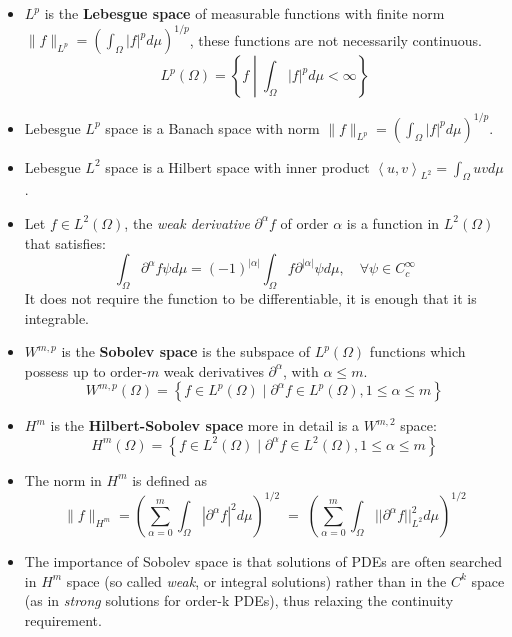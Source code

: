 \documentclass{digitaldynamics}
\begin{document}
\begin{itemize}
\begin{itemize}
		\item $L^p$ is the \textbf{Lebesgue space} of measurable functions with finite norm $\| f \|_{L^p}=\left( \int_\Omega |f|^p d\mu \right)^{1/p}$, these functions are not necessarily continuous.
		\[
		L^p(\Omega) = \left\{ f \; \left| \; \int_\Omega |f|^p d\mu < \infty \right. \right\}
		\]
		
		\item Lebesgue $L^p$ space is a Banach space with norm 
		$\| f \|_{L^p}=\left( \int_\Omega |f|^p d\mu \right)^{1/p}$.
		
		\item Lebesgue $L^2$ space is a Hilbert space with inner product 
		$\left\langle u , v \right\rangle_{L^2} = \int_\Omega u v d\mu$.
		
		\item Let $f \in L^2(\Omega)$, the \textit{weak derivative} $\partial^\alpha f$ of order $\alpha$ is a function in $L^2(\Omega)$ that satisfies:
		\[
		\int_\Omega \partial^\alpha f \psi d\mu =  (-1)^{|\alpha|} \int_\Omega f \partial^{|\alpha|} \psi d\mu, \quad \forall \psi 
		\in C^{\infty}_c
		\]
		It does not require the function to be differentiable, it is enough that it is integrable.
		
		\item  $W^{m,p}$ is the \textbf{Sobolev space} is the subspace of $L^p(\Omega)$ functions which possess up to order-$m$ weak derivatives $\partial^\alpha$, with $\alpha \leq m$.
		\[
		W^{m,p}(\Omega) = \left\{ f \in L^p(\Omega) \; | \; \partial^\alpha f \in L^p(\Omega), 1\leq  \alpha \leq m \right\}
		\]
		
		\item  $H^m$ is the \textbf{Hilbert-Sobolev space} more in detail is a $W^{m,2}$ space:
		\[
		H^m(\Omega) = \left\{ f \in L^2(\Omega) \; | \; \partial^\alpha f \in L^2(\Omega), 1\leq  \alpha \leq m \right\}
		\]
		
		\item The norm in $H^m$ is defined as
		\[
		\| f \|_{H^m} = \left( \sum_{\alpha=0}^m \int_\Omega |\partial^\alpha f|^2 d\mu \right)^{1/2} \; = \; 
							    \left( \sum_{\alpha=0}^m \int_\Omega ||\partial^\alpha f||^2_{L^2} d\mu \right)^{1/2}
		\]
		

		\item The importance of Sobolev space is that solutions of PDEs are often searched in $H^m$ space (so called \textit{weak}, or integral solutions) rather than in the $C^k$ space (as in \textit{strong} solutions for order-k PDEs), thus relaxing the continuity requirement.
		

\end{itemize}
\end{itemize}
\end{document}
